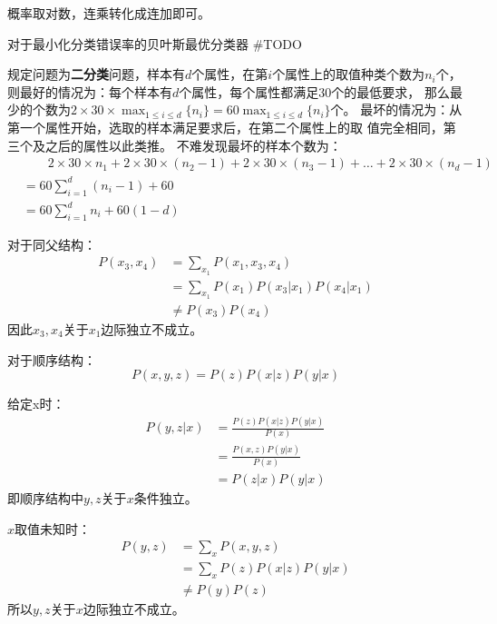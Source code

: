 \documentclass{ctexart}
\begin{document}
    \answer[7.4]
概率取对数，连乘转化成连加即可。
    

    \answer[7.5]
    对于最小化分类错误率的贝叶斯最优分类器 #TODO
    

    \answer[7.7]
规定问题为\textbf{二分类}问题，样本有$d$个属性，在第$i$个属性上的取值种类个数为$n_i$个，则最好的情况为：每个样本有$d$个属性，每个属性都满足30个的最低要求，
那么最少的个数为$2\times 30\times\max_{1\leq i\leq d}\{n_i\}= 60\max_{1\leq i\leq d}\{n_i\}$个。
最坏的情况为：从第一个属性开始，选取的样本满足要求后，在第二个属性上的取
值完全相同，第三个及之后的属性以此类推。
不难发现最坏的样本个数为：
$$
\begin{aligned}
    & \qquad 2\times 30\times n_1 + 2\times 30\times(n_2 - 1) + 2\times 30\times (n_3 - 1) + \dots + 2\times 30 \times (n_d - 1)\\
    & = 60\sum_{i=1}^d(n_i - 1) +60\\
    & = 60\sum_{i=1}^dn_i + 60(1-d)
\end{aligned}
$$

    \answer[7.8]
    对于同父结构：
    $$
\begin{aligned}
    P(x_3,x_4) & = \sum_{x_1}P(x_1,x_3,x_4)\\
               & = \sum_{x_1}P(x_1)P(x_3|x_1)P(x_4|x_1)\\
               & \neq P(x_3)P(x_4)    
\end{aligned}
$$
因此$x_3,x_4$关于$x_1$边际独立不成立。

对于顺序结构：
$$
    P(x, y, z) = P(z) P(x|z) P(y|x)
$$

给定x时：
$$
\begin{aligned}
    P(y, z|x) &= \frac{P(z)P(x|z)P(y|x)}{P(x)} \\
              &= \frac{P(x, z)P(y|x)}{P(x)}\\
              &= {P(z|x)P(y|x)}
\end{aligned}
$$
即顺序结构中$y,z$关于$x$条件独立。

$x$取值未知时：
$$
\begin{aligned}
    P(y,z) &= \sum_x P(x,y,z)\\
    &= \sum_x P(z)P(x|z)P(y|x)\\
    & \neq P(y)P(z)
\end{aligned}
$$
所以$y,z$关于$x$边际独立不成立。  
\end{document}
